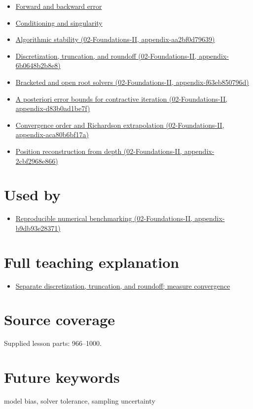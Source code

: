 \begin{itemize}
\tightlist
\item
  \hyperref[appendix-a7fbaf6d1b1c]{Forward and backward error}
\item
  \hyperref[appendix-8f6a01f284a7]{Conditioning and singularity}
\item
  \href{../02-Foundations-II/main.pdf\#nameddest=appendix-aa2bf0d79639}{Algorithmic stability (02-Foundations-II, appendix-aa2bf0d79639)}
\item
  \href{../02-Foundations-II/main.pdf\#nameddest=appendix-6b0648b2b8e8}{Discretization, truncation, and roundoff (02-Foundations-II, appendix-6b0648b2b8e8)}
\item
  \href{../02-Foundations-II/main.pdf\#nameddest=appendix-f63eb850796d}{Bracketed and open root solvers (02-Foundations-II, appendix-f63eb850796d)}
\item
  \href{../02-Foundations-II/main.pdf\#nameddest=appendix-d83b0ad1be7f}{A posteriori error bounds for contractive iteration (02-Foundations-II, appendix-d83b0ad1be7f)}
\item
  \href{../02-Foundations-II/main.pdf\#nameddest=appendix-aca80b6bf17a}{Convergence order and Richardson extrapolation (02-Foundations-II, appendix-aca80b6bf17a)}
\item
  \href{../02-Foundations-II/main.pdf\#nameddest=appendix-2cbf2968e866}{Position reconstruction from depth (02-Foundations-II, appendix-2cbf2968e866)}
\end{itemize}

\section{Used by}\label{appendix-31b8c295e05f-used-by}

\begin{itemize}
\tightlist
\item
  \href{../02-Foundations-II/main.pdf\#nameddest=appendix-b9db93e28371}{Reproducible numerical benchmarking (02-Foundations-II, appendix-b9db93e28371)}
\end{itemize}

\section{Full teaching explanation}\label{appendix-31b8c295e05f-full-teaching-explanation}

\begin{itemize}
\tightlist
\item
  \href{Continuous\%20Notes/Computing\%20Foundations\%20-\%20From\%20Bits\%20to\%20C++\%20and\%20Systems\%20APIs\#Separate\%20discretization,\%20truncation,\%20and\%20roundoff;\%20measure\%20convergence}{Separate discretization, truncation, and roundoff; measure convergence}
\end{itemize}

\section{Source coverage}\label{appendix-31b8c295e05f-source-coverage}

Supplied lesson parts: 966--1000.

\section{Future keywords}\label{appendix-31b8c295e05f-future-keywords}

model bias, solver tolerance, sampling uncertainty
